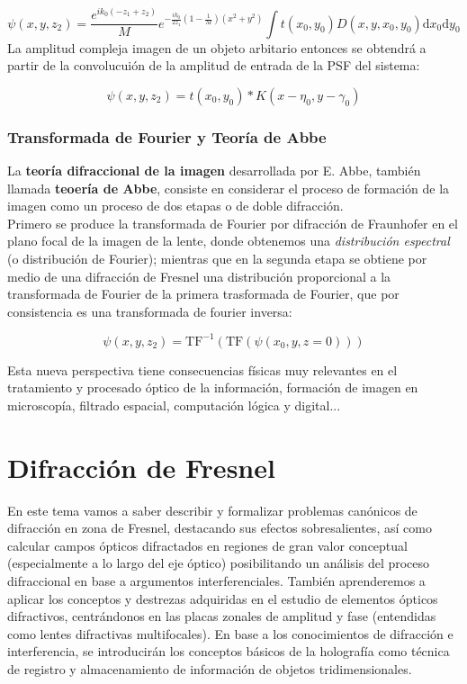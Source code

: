 \documentclass[12pt,a4paper]{book}
\numberwithin{equation}{section}
\numberwithin{figure}{section}
\newcommand{\parentesis}[1]{\left( #1  \right)}
\newcommand{\D}{\mathrm{d}}
\newcommand{\1}{_{(1)}}
\newcommand{\2}{_{(2)}}
\theoremstyle{definition}
\begin{document}
\begin{equation}
    \psi (x,y,z_2) = \frac{e^{ik_0(-z_1+z_2)}}{M} e^{-\frac{ik_0}{2z_1}\parentesis{1-\frac{1}{M}}(x^2+y^2)} \int t(x_0,y_0) D(x,y,x_0,y_0) \D x_0 \D y_0 
\end{equation}
La amplitud compleja imagen de un objeto arbitario entonces se obtendrá a partir de la convolucuión de la amplitud de entrada de la PSF del sistema:

\begin{equation}
    \psi (x,y,z_2) = t(x_0,y_0) * K (x-\eta_0,y-\gamma_0)
\end{equation}

\subsection{Transformada de Fourier y Teoría de Abbe}

La \textbf{teoría difraccional de la imagen} desarrollada por E. Abbe, también llamada \textbf{teoería de Abbe}, consiste en considerar el proceso de formación de la imagen como un proceso de dos etapas o de doble difracción. \\

Primero se produce la transformada de Fourier por difracción de Fraunhofer en el plano focal de la imagen de la lente, donde obtenemos una \textit{distribución espectral} (o distribución de Fourier); mientras que en la segunda etapa se obtiene por medio de una difracción de Fresnel una distribución proporcional a la transformada de Fourier de la primera trasformada de Fourier, que por consistencia es una transformada de fourier inversa:

\begin{equation}
    \psi (x,y,z_2) = \mathrm{TF}^{-1} (\mathrm{TF}(\psi(x_0,y,z=0)))
\end{equation}

Esta nueva perspectiva tiene consecuencias físicas muy relevantes en el tratamiento y procesado óptico de la información, formación de imagen en microscopía, filtrado espacial, computación lógica y digital...

\chapter{Difracción de Fresnel}

En este tema vamos a saber describir y formalizar problemas canónicos de difracción en zona de Fresnel, destacando sus efectos sobresalientes, así como calcular campos ópticos difractados en regiones de gran valor conceptual (especialmente a lo largo del eje óptico) posibilitando un análisis del proceso difraccional en base a argumentos interferenciales. También aprenderemos a aplicar los conceptos y destrezas adquiridas en el estudio de elementos ópticos difractivos, centrándonos en las placas zonales de amplitud y fase (entendidas como lentes difractivas multifocales). En base a los conocimientos de difracción e interferencia, se introducirán los conceptos básicos de la holografía como técnica de registro y almacenamiento de información de objetos tridimensionales. \\
\end{document}
